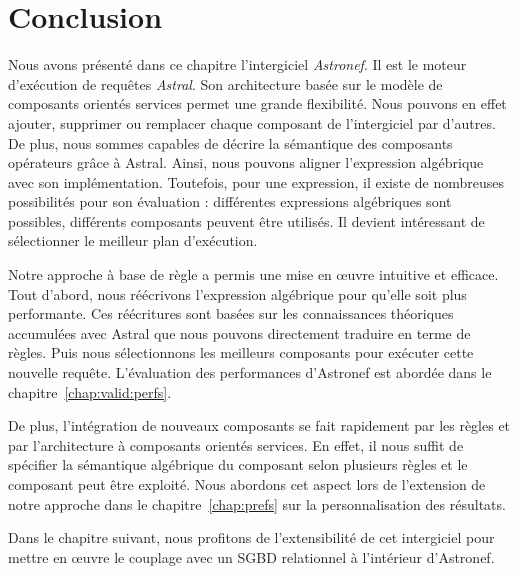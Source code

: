\section{Conclusion}\label{sec:contrib:astronef:conclusion}
Nous avons présenté dans ce chapitre l'intergiciel \textit{Astronef}. Il est le moteur d'exécution de requêtes \textit{Astral}. Son architecture basée sur le modèle de composants orientés services permet une grande flexibilité. Nous pouvons en effet ajouter, supprimer ou remplacer chaque composant de l'intergiciel par d'autres. De plus, nous sommes capables de décrire la sémantique des composants opérateurs grâce à Astral. Ainsi, nous pouvons aligner l'expression algébrique avec son implémentation. Toutefois, pour une expression, il existe de nombreuses possibilités pour son évaluation : différentes expressions algébriques sont possibles, différents composants peuvent être utilisés. Il devient intéressant de sélectionner le meilleur plan d'exécution.

Notre approche à base de règle a permis une mise en œuvre intuitive et efficace. Tout d'abord, nous réécrivons l'expression algébrique pour qu'elle soit plus performante. Ces réécritures sont basées sur les connaissances théoriques accumulées avec Astral que nous pouvons directement traduire en terme de règles. Puis nous sélectionnons les meilleurs composants pour exécuter cette nouvelle requête. L'évaluation des performances d'Astronef est abordée dans le chapitre~\ref{chap:valid:perfs}. 

De plus, l'intégration de nouveaux composants se fait rapidement par les règles et par l'architecture à composants orientés services. En effet, il nous suffit de spécifier la sémantique algébrique du composant selon plusieurs règles et le composant peut être exploité. Nous abordons cet aspect lors de l'extension de notre approche dans le chapitre~\ref{chap:prefs} sur la personnalisation des résultats.

Dans le chapitre suivant, nous profitons de l'extensibilité de cet intergiciel pour mettre en œuvre le couplage avec un SGBD relationnel à l'intérieur d'Astronef.
